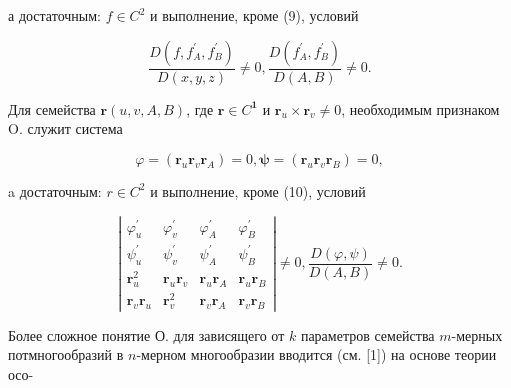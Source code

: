\documentclass[10pt]{article}
\begin{document}
а достаточным: $f \in C^{2}$ и выполнение, кроме (9), условий



\[

\frac{D\left(f, f_{A}^{\prime}, f_{B}^{\prime}\right)}{D(x, y, z)} \neq 0, \frac{D\left(f_{A}^{\prime}, f_{B}^{\prime}\right)}{D(A, B)} \neq 0 .

\]



Для семейства $\boldsymbol{r}(u, v, A, B)$, где $\boldsymbol{r} \in C^{\mathbf{1}}$ и $\boldsymbol{r}_{u} \times \boldsymbol{r}_{v} \neq 0$, необходимым признаком $\mathrm{O}$. служит система



\[

\varphi=\left(\boldsymbol{r}_{u} \boldsymbol{r}_{v} \boldsymbol{r}_{A}\right)=0, \boldsymbol{\psi}=\left(\boldsymbol{r}_{u} \boldsymbol{r}_{v} \boldsymbol{r}_{B}\right)=0,

\]



a достаточным: $r \in C^{2}$ и выполнение, кроме (10), условий



\[

\left|\begin{array}{cccc}

\varphi_{u}^{\prime} & \varphi_{v}^{\prime} & \varphi_{A}^{\prime} & \varphi_{B}^{\prime} \\

\psi_{u}^{\prime} & \psi_{v}^{\prime} & \psi_{A}^{\prime} & \psi_{B}^{\prime} \\

\boldsymbol{r}_{u}^{2} & \boldsymbol{r}_{u} \boldsymbol{r}_{v} & \boldsymbol{r}_{u} \boldsymbol{r}_{A} & \boldsymbol{r}_{u} \boldsymbol{r}_{B} \\

\boldsymbol{r}_{v} \boldsymbol{r}_{u} & \boldsymbol{r}_{v}^{2} & \boldsymbol{r}_{v} \boldsymbol{r}_{A} & \boldsymbol{r}_{v} \boldsymbol{r}_{B}

\end{array}\right| \neq 0, \frac{D(\varphi, \psi)}{D(A, B)} \neq 0 .

\]



Более сложное понятие О. для зависящего от $k$ параметров семейства $m$-мерных потмногообразий в $n$-мерном многообразии вводится (см. [1]) на основе теории осо-
\end{document}
